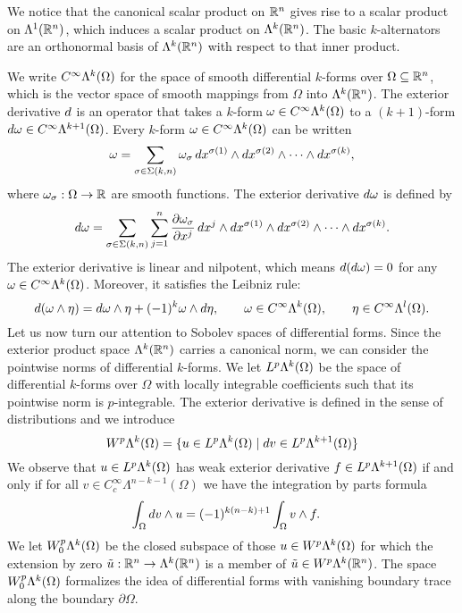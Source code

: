 \documentclass[12pt,a4paper]{article}
\begin{document}
We notice that the canonical scalar product on ${\mathbb R}^{n}$ gives rise to a scalar product on $\Lambda^{1}({\mathbb R}^{n})$,
which induces a scalar product on $\Lambda^{k}({\mathbb R}^{n})$.
The basic $k$-alternators are an orthonormal basis of $\Lambda^{k}({\mathbb R}^{n})$ with respect to that inner product. 

We write $C^{\infty}\Lambda^{k}(\Omega)$ for the space of smooth differential $k$-forms over $\Omega \subseteq {\mathbb R}^{n}$,
which is the vector space of smooth mappings from $\Omega$ into $\Lambda^{k}({\mathbb R}^{n})$.
The exterior derivative \( d \) is an operator that takes a \( k \)-form \( \omega \in C^{\infty}\Lambda^{k}(\Omega) \) 
to a \((k+1)\)-form \( d\omega \in C^{\infty}\Lambda^{k+1}(\Omega) \). 
Every \( k \)-form \( \omega \in C^{\infty}\Lambda^{k}(\Omega) \) can be written 
\[
    \omega = 
    \sum_{ \sigma \in \Sigma(k,n) } 
    \omega_{\sigma} \, 
    dx^{\sigma(1)} \wedge dx^{\sigma(2)} \wedge \cdots \wedge dx^{\sigma(k)},
\]
where \( \omega_{\sigma} : \Omega \rightarrow {\mathbb R} \) are smooth functions.
The exterior derivative \( d\omega \) is defined by
\[
    d\omega = 
    \sum_{ \sigma \in \Sigma(k,n) } 
    \sum_{j=1}^{n} 
    \frac{\partial \omega_{\sigma}}{\partial x^j} 
    \, dx^j \wedge 
    dx^{\sigma(1)} \wedge dx^{\sigma(2)} \wedge \cdots \wedge dx^{\sigma(k)}.
\]
The exterior derivative is linear and nilpotent, which means 
\( d(d\omega) = 0 \) for any \( \omega \in C^{\infty}\Lambda^{k}(\Omega) \).
Moreover, it satisfies the Leibniz rule:
\[ 
    d(\omega \wedge \eta) 
    = 
    d\omega \wedge \eta + (-1)^{k} \omega \wedge d\eta, 
    \qquad \omega \in C^{\infty}\Lambda^{k}(\Omega), 
    \qquad \eta \in C^{\infty}\Lambda^{l}(\Omega).
\]
Let us now turn our attention to Sobolev spaces of differential forms. 
Since the exterior product space $\Lambda^{k}({\mathbb R}^{n})$ carries a canonical norm, we can consider the pointwise norms of differential $k$-forms. 
We let $L^{p}\Lambda^{k}(\Omega)$ be the space of differential $k$-forms over $\Omega$ with locally integrable coefficients 
such that its pointwise norm is $p$-integrable. 
The exterior derivative is defined in the sense of distributions and we introduce 
\[
    W^p\Alt^{k}(\Omega) = \{ u \in L^{p}\Alt^{k}(\Omega) \suchthat \cartan v \in L^{p}\Alt^{k+1}(\Omega) \}
\]
We observe that $u \in L^p\Lambda^{k}(\Omega)$ has weak exterior derivative $f \in L^p\Lambda^{k+1}(\Omega)$
if and only if for all $v \in C^{\infty}_{c}\Lambda^{n-k-1}(\Omega)$ we have the integration by parts formula
\begin{align*}
    \int_{\Omega} d v \wedge u
    &=
    (-1)^{k(n-k)+1}
    \int_{\Omega} v \wedge f 
    .
\end{align*}
We let $W^p_{0}\Lambda^{k}(\Omega)$ be the closed subspace of those $u \in W^p\Lambda^{k}(\Omega)$ 
for which the extension by zero $\tilde u : {\mathbb R}^{n} \rightarrow \Lambda^{k}({\mathbb R}^{n})$ is a member of $\tilde u \in W^p\Lambda^{k}({\mathbb R}^{n})$. 
The space $W^p_{0}\Lambda^{k}(\Omega)$ formalizes the idea of differential forms with vanishing boundary trace along the boundary $\partial\Omega$. 
\end{document}
